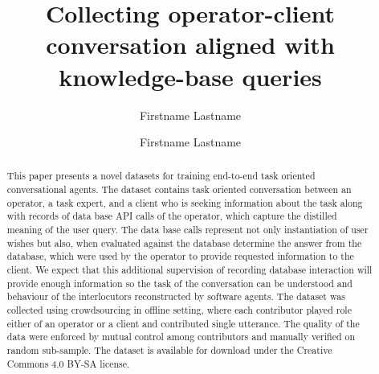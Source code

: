 \documentclass[runningheads,a4paper]{llncs}
\begin{document}


\title{Collecting operator-client conversation aligned with knowledge-base queries}


%
\iftrue %
\author{Firstname Lastname \and Firstname Lastname }

\fi
			
\maketitle

\begin{abstract}
    This paper presents a novel datasets for training end-to-end task oriented conversational agents.
    The dataset contains task oriented conversation between an operator, a task expert, and a client who is seeking information about the task along with records of data base API calls of the operator, which capture the distilled meaning of the user query.
    The data base calls represent not only instantiation of user wishes but also, when evaluated against the database determine the answer from the database, which were used by the operator to provide requested information to the client. 
    We expect that this additional supervision of recording database interaction will provide enough information so the task of the conversation can be understood and behaviour of the interlocutors reconstructed by software agents.
    The dataset was collected using crowdsourcing in offline setting, where each contributor played role either of an operator or a client and contributed single utterance.
    The quality of the data were enforced by mutual control among contributors and manually verified on random sub-sample.
    The dataset is available for download under the Creative Commons 4.0 BY-SA license.
\end{abstract}
\end{document}
